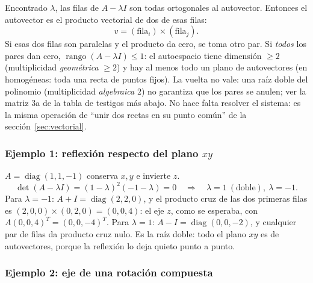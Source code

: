 \begin{idea}
Encontrado \(\lambda\), las filas de \(A-\lambda I\) son todas ortogonales al autovector.
Entonces el autovector es el producto vectorial de dos de esas filas:
\[
  v=(\text{fila}_i)\times(\text{fila}_j) .
\]
Si esas dos filas son paralelas y el producto da cero, se toma otro par. Si \emph{todos} los
pares dan cero, \(\operatorname{rango}(A-\lambda I)\le1\): el autoespacio tiene dimensión
\(\ge2\) (multiplicidad \emph{geométrica} \(\ge2\)) y hay al menos todo un plano de
autovectores (en homogéneas: toda una recta de puntos fijos). La vuelta no vale: una raíz
doble del polinomio (multiplicidad \emph{algebraica} \(2\)) no garantiza que los pares se
anulen; ver la matriz 3a de la tabla de testigos más abajo. No hace falta resolver el sistema: es la
misma operación de ``unir dos rectas en su punto común'' de la sección~\ref{sec:vectorial}.
\end{idea}

\subsubsection{Ejemplo 1: reflexión respecto del plano \texorpdfstring{$xy$}{xy}}

\(A=\operatorname{diag}(1,1,-1)\) conserva \(x,y\) e invierte \(z\).
\[
  \det(A-\lambda I)=(1-\lambda)^2(-1-\lambda)=0
  \quad\Longrightarrow\quad\lambda=1\ (\text{doble}),\ \lambda=-1 .
\]
Para \(\lambda=-1\): \(A+I=\operatorname{diag}(2,2,0)\), y el producto cruz de las dos
primeras filas es \((2,0,0)\times(0,2,0)=(0,0,4)\): el eje \(z\), como se esperaba, con
\(A(0,0,4)^T=(0,0,-4)^T\). Para \(\lambda=1\): \(A-I=\operatorname{diag}(0,0,-2)\), y
cualquier par de filas da producto cruz nulo. Es la raíz doble: todo el plano \(xy\) es de
autovectores, porque la reflexión lo deja quieto punto a punto.

\subsubsection{Ejemplo 2: eje de una rotación compuesta}

